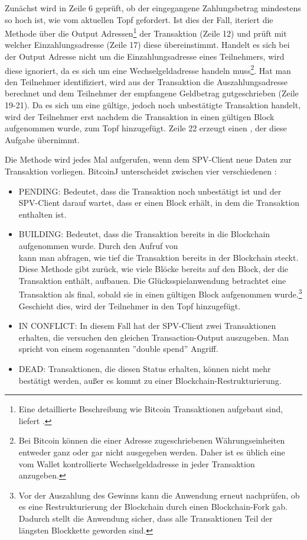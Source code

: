 
Zunächst wird in Zeile 6 geprüft, ob der eingegangene Zahlungsbetrag mindestens so hoch ist, wie vom aktuellen Topf gefordert. Ist dies der Fall, iteriert die Methode über die Output Adressen\footnote{Eine detaillierte Beschreibung wie Bitcoin Transaktionen aufgebaut sind, liefert \cite{understanding_btc_txn}.} der Transaktion (Zeile 12) und prüft mit welcher Einzahlungsadresse (Zeile 17) diese übereinstimmt. Handelt es sich bei der Output Adresse nicht um die Einzahlungsadresse eines Teilnehmers, wird diese ignoriert, da es sich um eine Wechselgeldadresse handeln muss\footnote{Bei Bitcoin können die einer Adresse zugeschriebenen Währungseinheiten entweder ganz oder gar nicht ausgegeben werden. Daher ist es üblich eine vom Wallet kontrollierte Wechselgeldadresse in jeder Transaktion anzugeben.}. Hat man den Teilnehmer identifiziert, wird aus der Transaktion die Auszahlungsadresse berechnet und dem Teilnehmer der empfangene Geldbetrag gutgeschrieben (Zeile 19-21). Da es sich um eine gültige, jedoch noch unbestätigte Transaktion handelt, wird der Teilnehmer erst nachdem die Transaktion in einen gültigen Block aufgenommen wurde, zum Topf hinzugefügt. Zeile 22 erzeugt einen , der diese Aufgabe übernimmt.


Die  Methode wird jedes Mal aufgerufen, wenn dem SPV-Client neue Daten zur Transaktion vorliegen. BitcoinJ unterscheidet zwischen vier verschiedenen :
\begin{itemize}
\item PENDING: Bedeutet, dass die Transaktion noch unbestätigt ist und der SPV-Client darauf wartet, dass er einen Block erhält, in dem die Transaktion enthalten ist.
\item BUILDING: Bedeutet, dass die Transaktion bereits in die Blockchain aufgenommen wurde. Durch den Aufruf von \\  kann man abfragen, wie tief die Transaktion bereits in der Blockchain steckt. Diese Methode gibt zurück, wie viele Blöcke bereits auf den Block, der die Transaktion enthält, aufbauen. Die Glücksspielanwendung betrachtet eine Transaktion als final, sobald sie in einen gültigen Block aufgenommen wurde.\footnote{Vor der Auszahlung des Gewinns kann die Anwendung erneut nachprüfen, ob es eine Restrukturierung der Blockchain durch einen Blockchain-Fork gab. Dadurch stellt die Anwendung sicher, dass alle Transaktionen Teil der längsten Blockkette geworden sind.} Geschieht dies, wird der Teilnehmer in den Topf hinzugefügt.
\item IN CONFLICT: In diesem Fall hat der SPV-Client zwei Transaktionen erhalten, die versuchen den gleichen Transaction-Output auszugeben. Man spricht von einem sogenannten ''double spend'' Angriff. 
\item DEAD: Transaktionen, die diesen Status erhalten, können nicht mehr bestätigt werden, außer es kommt zu einer Blockchain-Restrukturierung.
\end{itemize}

